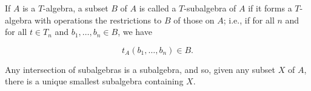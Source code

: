 If $A$ is a $T$-algebra, a subset $B$ of $A$ is called a $T$-subalgebra of $A$ if it forms a $T$-algebra with operations the restrictions to $B$ of those on $A$; i.e., if for all $n$ and for all $t \in T_n$ and $b_1, \ldots, b_n \in B$, we have

$$t_A(b_1, \ldots, b_n) \in B.$$

Any intersection of subalgebras is a subalgebra, and so, given any subset $X$ of $A$, there is a unique smallest subalgebra containing $X$.
